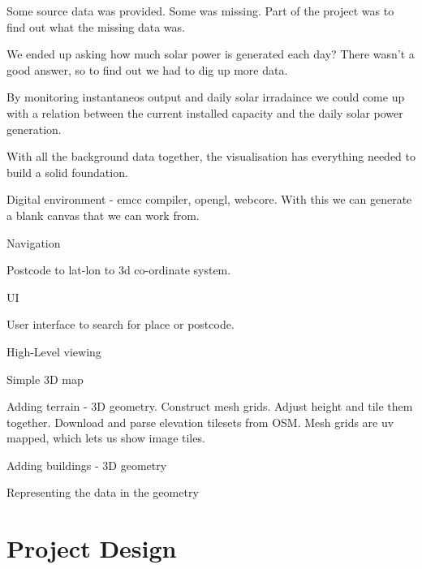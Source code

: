 \documentclass[10pt, a4paper]{article}
\begin{document}
\begin{multicols}{2}
Some source data was provided. Some was missing. Part of the project was to find out what the missing data was.

We ended up asking how much solar power is generated each day? There wasn't a good answer, so to find out we had to dig up more data.

By monitoring instantaneos output and daily solar irradaince we could come up with a relation between the current installed capacity and the daily solar power generation.

With all the background data together, the visualisation has everything needed to build a solid foundation.

Digital environment - emcc compiler, opengl, webcore. With this we can generate a blank canvas that we can work from.

Navigation

Postcode to lat-lon to 3d co-ordinate system.

UI

User interface to search for place or postcode.

High-Level viewing

Simple 3D map

Adding terrain - 3D geometry. 
Construct mesh grids. 
Adjust height and tile them together. 
Download and parse elevation tilesets from OSM. 
Mesh grids are uv mapped, which lets us show image tiles.

Adding buildings - 3D geometry

Representing the data in the geometry




\section{Project Design}





\end{multicols}
\end{document}
